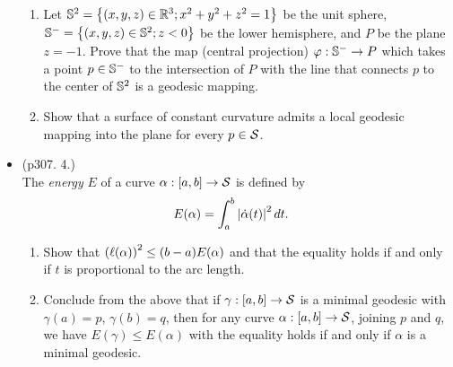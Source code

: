\documentclass[11pt]{article}
\begin{document}
\begin{itemize}
\begin{example}
\begin{enumerate}
\item Let ${\mathbb S}^{2} = \left\{(x,y,z) \in {\mathbb R}^{3}; x^{2}+ y^{2}+ z^{2} = 1\right\}$ be the unit sphere, ${\mathbb S}^{-} = \left\{(x,y,z) \in {\mathbb S}^{2}; z < 0\right\}$ be the lower hemisphere, and $P$ be the plane $z=-1$. Prove that the map (central projection) $\varphi: {\mathbb S}^{-} \rightarrow P$ which takes a point $p\in {\mathbb S}^{-}$ to the intersection of $P$ with the line that connects $p$ to the center of ${\mathbb S}^{2}$ is a geodesic mapping. 

\item Show that a surface of constant curvature admits a local geodesic mapping into the plane for every $p\in {\mathcal S}$.
\end{enumerate}
\end{example}

\newpage
\item \begin{example}\citep{do1976differential} (p307. 4.)\\
The \emph{energy} $E$ of a curve $\alpha: [a,b] \rightarrow {\mathcal S}$ is defined by 
\begin{align*}
E(\alpha) &= \int_{a}^{b}\left\lvert \dot{\alpha}(t) \right\rvert^{2}dt.
\end{align*}
\begin{enumerate}
\item Show that $\left(\ell(\alpha)\right)^{2} \le (b-a)E(\alpha)$ and that the equality holds if and only if $t$ is proportional to the arc length. 

\item Conclude from the above that if $\gamma: [a,b]\rightarrow {\mathcal S}$ is a minimal geodesic with $\gamma(a) = p$, $\gamma(b) = q$, then for any curve $\alpha:  [a,b]\rightarrow {\mathcal S}$, joining $p$ and $q$, we have $E(\gamma) \le E(\alpha) $ with the equality holds if and only if $\alpha$ is a minimal geodesic. 
\end{enumerate}
\end{example}


\end{itemize}
\end{document}
